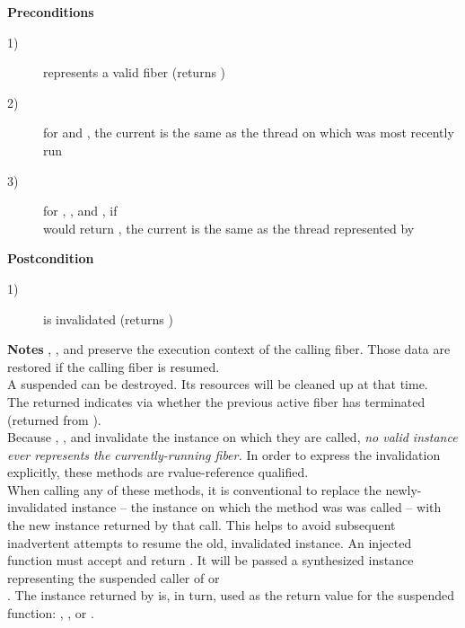 {\bfseries Preconditions}
\begin{description}
    \item[1)]  represents a valid fiber (\opbool returns )
    \item[2)] for \resume and \resumewith, the current \thread is the same as
              the thread on which  was most recently run
    \item[3)] for \resume, \resumewith, \xtresume and \xtresumewith, if\\
              \usessysstack would return , the current \thread is
              the same as the thread represented by 
\end{description}

{\bfseries Postcondition}
\begin{description}
    \item[1)]  is invalidated (\opbool returns )
\end{description}

{\bfseries Notes}
\newline
\resume, \resumewith, \xtresume and \xtresumewith preserve the execution
context of the calling fiber. Those data are restored if the calling fiber is
resumed.\\
A suspended  can be destroyed. Its resources will be cleaned
up at that time.\\
The returned  indicates via \opbool whether the previous active
fiber has terminated (returned from \entryfn).\\
Because \resume, \resumewith, \xtresume and \xtresumewith invalidate the
instance on which they are called, \emph{no valid \fiber instance ever
represents the currently-running fiber.} In order to express the invalidation
explicitly, these methods are rvalue-reference qualified.\\
When calling any of these methods, it is conventional to replace the
newly-invalidated instance -- the instance on which the method was was called
-- with the new instance returned by that call. This helps to avoid subsequent
inadvertent attempts to resume the old, invalidated instance.
\newline
An injected function  must accept  and
return \fiber. It will be passed a synthesized \fiber instance representing
the suspended caller of \resumewith or\\
\xtresumewith. The \fiber instance returned by  is, in turn, used as
the return value for the suspended function: \resume, \resumewith, \xtresume
or \xtresumewith.

